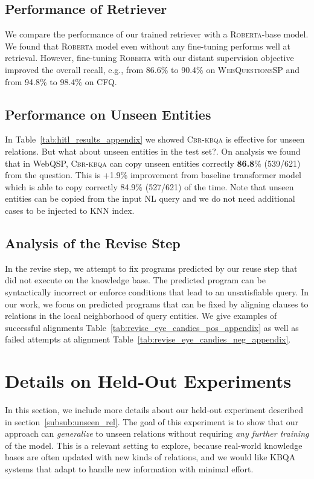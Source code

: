 \documentclass[11pt]{article}
\newcommand{\roberta}{\textsc{Roberta}\xspace}
\newcommand{\webqsp}{\textsc{WebQuestionsSP}\xspace}
\newcommand{\alg}{\textsc{Cbr-kbqa}\xspace}
\begin{document}
\subsection{Performance of Retriever}
\label{sub:appendix_retriever}
We compare the performance of our trained retriever with a \roberta-base model. We found that \roberta model even without any fine-tuning performs well at retrieval. However, fine-tuning \roberta with our distant supervision objective improved the overall recall, e.g., from 86.6\% to 90.4\% on \webqsp and from 94.8\% to 98.4\% on CFQ.

\subsection{Performance on Unseen Entities}
In Table~\ref{tab:hitl_results_appendix} we showed \alg is effective for unseen relations. But what about unseen entities in the test set?. On analysis we found that in WebQSP, \alg can copy unseen entities correctly \textbf{86.8}\% (539/621) from the question. This is +1.9\% improvement from baseline transformer model which is able to copy correctly 84.9\% (527/621) of the time. Note that unseen entities can be copied from the input NL query and we do not need additional cases to be injected to KNN index.


\subsection{Analysis of the Revise Step}


In the revise step, we attempt to fix programs predicted by our reuse step that did not execute on the knowledge base. The predicted program can be syntactically incorrect or enforce conditions that lead to an unsatisfiable query. In our work, we focus on predicted programs that can be fixed by aligning clauses to relations in the local neighborhood of query entities. We give examples of successful alignments Table~\ref{tab:revise_eye_candies_pos_appendix} as well as failed attempts at alignment Table~\ref{tab:revise_eye_candies_neg_appendix}.

\section{Details on Held-Out Experiments}
\label{sub:held_out_appendix}


In this section, we include more details about our held-out experiment described in section~\ref{subsub:unseen_rel}. The goal of this experiment is to show that our approach can \emph{generalize} to unseen relations without requiring \emph{any further training} of the model.
This is a relevant setting to explore, because real-world knowledge bases are often updated with new kinds of relations, and we would like KBQA systems that adapt to handle new information with minimal effort.
\end{document}
